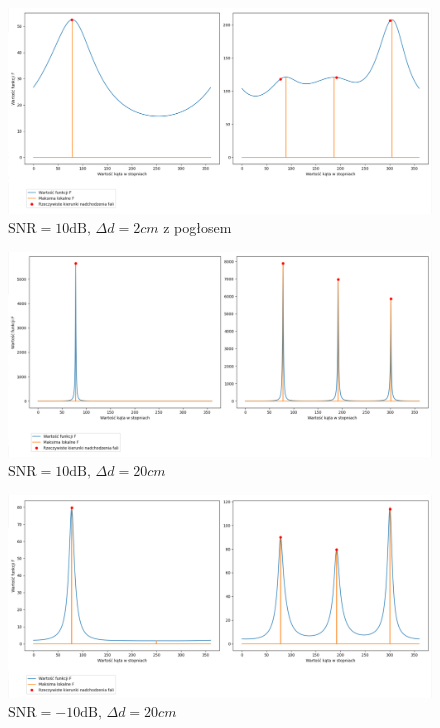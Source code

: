 \begin{figure}[h!]
    \centering
    \includegraphics[width=\textwidth]{Images/music_10db_reverb.png}
    \caption{$\mathrm{SNR}=10\mathrm{dB}, \, \Delta d = 2cm$ z pogłosem}
    \label{fig:music_10db_2cm_reverb}
\end{figure}

\begin{figure}[h!]
    \centering
    \includegraphics[width=\textwidth]{Images/music_10db_0.2m.png}
    \caption{$\mathrm{SNR}=10\mathrm{dB}, \, \Delta d = 20cm$}
    \label{fig:music_10db_20cm}
\end{figure}

\begin{figure}[h!]
    \centering
    \includegraphics[width=\textwidth]{Images/music_-10db_0.2m.png}
    \caption{$\mathrm{SNR}=-10\mathrm{dB}, \, \Delta d = 20cm$}
    \label{fig:music_-10db_20cm}
\end{figure}

